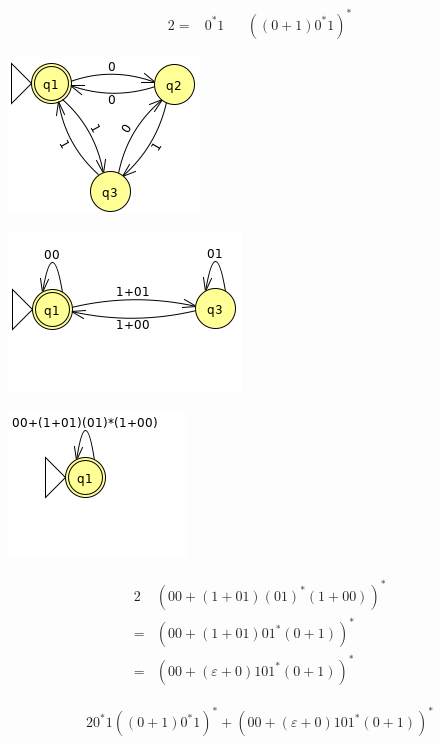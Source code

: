 {\begin{center}
\begin{minipage}{0.60\textwidth}
\begin{alignat*}{2}
		=& 0^*1                   &&((0+1)0^*1)^*
	\end{alignat*}
\end{minipage}
\end{center}
\begin{center}
\begin{minipage}{0.30\textwidth}
	\begin{center} \includegraphics[scale=0.5,trim={0  7mm 0 0}]{TP05_10_b_1_2} \end{center}
	\begin{center} \includegraphics[scale=0.5,trim={0 20mm 0 0}]{TP05_10_b_2_2} \end{center}
	\begin{center} \includegraphics[scale=0.5,trim={0 20mm 0 0}]{TP05_10_b_3_2} \end{center}
\end{minipage}%
\begin{minipage}{0.60\textwidth}
	\begin{alignat*}{2}
	 	 & (00+(1+01)(01)^*(1+00))^*\\
		=& (00+(1+01)01^*(0+1))^* \\
		=& (00+(\varepsilon+0)101^*(0+1))^*
	\end{alignat*}
\end{minipage}
\end{center}
\begin{alignat*}{2}
	0^*1((0+1)0^*1)^* + (00+(\varepsilon+0)101^*(0+1))^*
\end{alignat*}
}
